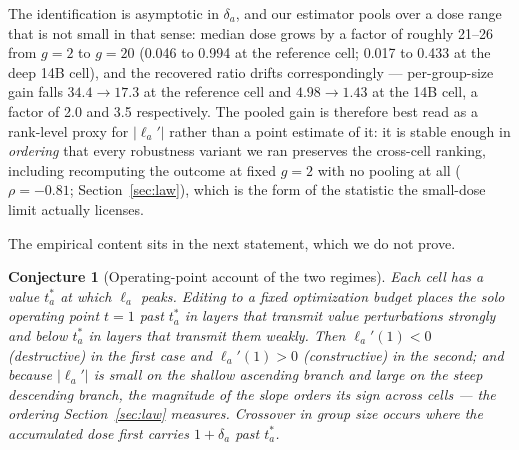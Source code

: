 \documentclass[preprint,12pt]{elsarticle}
\newtheorem{conjecture}{Conjecture}
\theoremstyle{definition}
\begin{document}
The identification is asymptotic in $\delta_a$, and our estimator pools over a dose range
that is not small in that sense: median dose grows by a factor of roughly 21--26 from
$g{=}2$ to $g{=}20$ (0.046 to 0.994 at the reference cell; 0.017 to 0.433 at the deep 14B
cell), and the recovered ratio drifts correspondingly --- per-group-size gain falls
$34.4\to17.3$ at the reference cell and $4.98\to1.43$ at the 14B cell, a factor of 2.0
and 3.5 respectively. The pooled gain is therefore best read as a rank-level proxy for
$|\ell_a'|$ rather than a point estimate of it: it is stable enough in \emph{ordering}
that every robustness variant we ran preserves the cross-cell ranking, including
recomputing the outcome at fixed $g{=}2$ with no pooling at all
($\rho=-0.81$; Section~\ref{sec:law}), which is the form of the statistic the
small-dose limit actually licenses.

The empirical content sits in the next statement, which we do not prove.

\begin{conjecture}[Operating-point account of the two regimes]\label{conj:opt}
Each cell has a value $t^{*}_a$ at which $\ell_a$ peaks. Editing to a fixed optimization
budget places the solo operating point $t{=}1$ \emph{past} $t^{*}_a$ in layers that
transmit value perturbations strongly and \emph{below} $t^{*}_a$ in layers that transmit
them weakly. Then $\ell_a'(1)<0$ (destructive) in the first case and $\ell_a'(1)>0$
(constructive) in the second; and because $|\ell_a'|$ is small on the shallow ascending
branch and large on the steep descending branch, the magnitude of the slope orders its
sign across cells --- the ordering Section~\ref{sec:law} measures. Crossover in group
size occurs where the accumulated dose first carries $1+\delta_a$ past $t^{*}_a$.
\end{conjecture}
\end{document}
